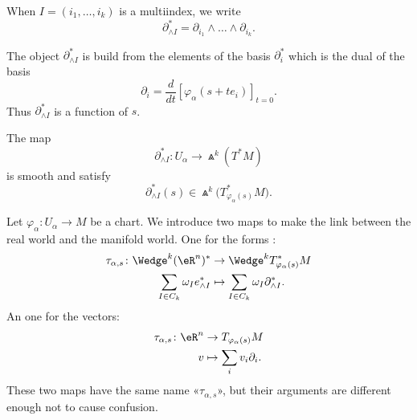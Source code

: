 \begin{normaltext}
	When \( I=(i_1,\ldots,i_k)\) is a multiindex, we write
	\begin{equation}
		\partial^*_{\wedge I}=\partial_{i_1}\wedge\ldots\wedge\partial_{i_k}.
	\end{equation}
\end{normaltext}

\begin{normaltext}
	The object \( \partial^*_{\wedge I}\) is build from the elements of the basis \( \partial_i^*\) which is the dual of the basis
	\begin{equation}
		\partial_i=\frac{d}{dt} \left[ \varphi_{\alpha}(s+te_i)  \right]_{t=0}.
	\end{equation}
	Thus \( \partial^*_{\wedge I}\) is a function of \( s\).
\end{normaltext}

\begin{lemma}		\label{LEMooIAASooDnnhRA}
	The map
	\begin{equation}
		\partial^*_{\wedge I}\colon U_{\alpha} \to \Wedge^k(T^*M)
	\end{equation}
	is smooth and satisfy
	\begin{equation}
		\partial_{\wedge I}^*(s)\in\Wedge^k\big( T^*_{\varphi_{\alpha}(s)}M \big).
	\end{equation}
\end{lemma}

\begin{normaltext}		\label{NORMooDQEZooHaJPoa}
	Let \(\varphi_{\alpha} \colon U_{\alpha}\to M  \) be a chart. We introduce two maps to make the link between the real world and the manifold world. One for the forms :
	\begin{equation}
		\begin{aligned}
			\tau_{\alpha,s}\colon \Wedge^k(\eR^n)^* & \to \Wedge^kT^*_{\varphi_{\alpha}(s)}M                \\
			\sum_{I\in C_k}\omega_Ie^*_{\wedge I}   & \mapsto \sum_{I\in C_k}\omega_I\partial^*_{\wedge I}.
		\end{aligned}
	\end{equation}
	An one for the vectors:
	\begin{equation}
		\begin{aligned}
			\tau_{\alpha,s}\colon \eR^n & \to T_{\varphi_{\alpha}(s)}M \\
			v                           & \mapsto \sum_iv_i\partial_i.
		\end{aligned}
	\end{equation}
	These two maps have the same name «\( \tau_{\alpha,s}\)», but their arguments are different enough not to cause confusion.
\end{normaltext}


